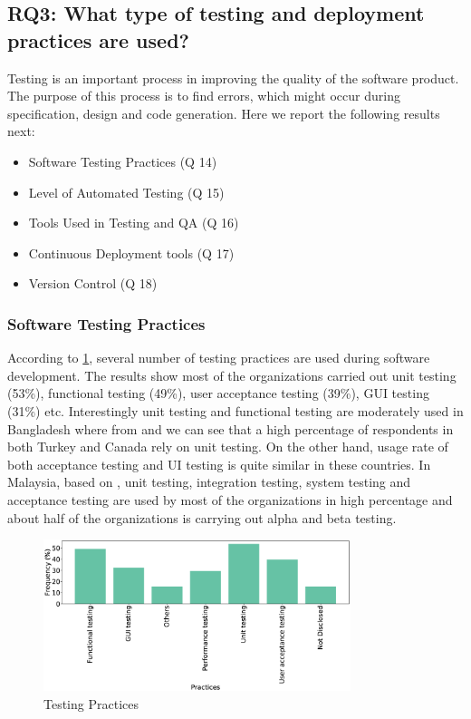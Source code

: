 \subsection{RQ3: What type of testing and deployment practices are used?}
\label{RQ3}
Testing is an important process in improving the quality of the software product. The purpose of this process is to find errors, which might occur during specification, design and code generation. Here we report the following results next:
\begin{itemize}
\item Software Testing Practices (Q 14)
\item Level of Automated Testing (Q 15)
\item Tools Used in Testing and QA (Q 16)
\item Continuous Deployment tools (Q 17)
\item Version Control (Q 18)
\end{itemize}

\subsubsection{Software Testing Practices}
According to \ref{fig:testing}, several number of testing practices are used during software development. The results show most of the organizations carried out unit testing (53\%), functional testing (49\%), user acceptance testing (39\%), GUI testing (31\%) etc. Interestingly unit testing and functional testing are moderately used in Bangladesh where from \cite{Wang2018} and \cite{Garousi2013} we can see that a high percentage of respondents in both Turkey and Canada rely on unit testing. On the other hand, usage rate of both acceptance testing and UI testing is quite similar in these countries. In Malaysia, based on \cite{Baharom2006}, unit testing, integration testing, system testing and acceptance testing are used by most of the organizations in high percentage and about half of the organizations is carrying out alpha and beta testing.
\begin{figure}[htbp]
\centering
  \includegraphics[width=0.8\textwidth]{Figures/Respondents_testing_practices}
  \caption{Testing Practices}
  \label{fig:testing}
\end{figure}

